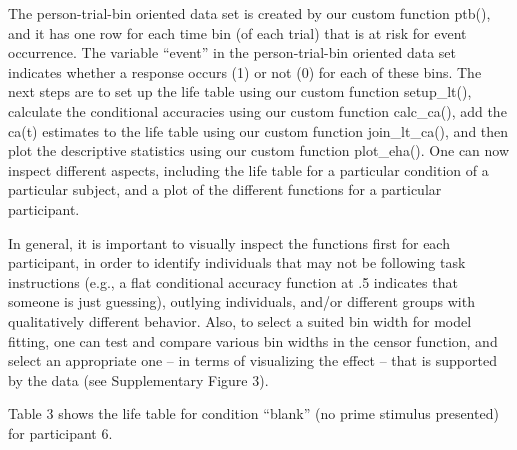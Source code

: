 \documentclass[
  english,
  man, donotrepeattitle,floatsintext]{apa6}
\begin{document}
The person-trial-bin oriented data set is created by our custom function ptb(), and it has one row for each time bin (of each trial) that is at risk for event occurrence. The variable ``event'' in the person-trial-bin oriented data set indicates whether a response occurs (1) or not (0) for each of these bins. The next steps are to set up the life table using our custom function setup\_lt(), calculate the conditional accuracies using our custom function calc\_ca(), add the ca(t) estimates to the life table using our custom function join\_lt\_ca(), and then plot the descriptive statistics using our custom function plot\_eha().
One can now inspect different aspects, including the life table for a particular condition of a particular subject, and a plot of the different functions for a particular participant.

In general, it is important to visually inspect the functions first for each participant, in order to identify individuals that may not be following task instructions (e.g., a flat conditional accuracy function at .5 indicates that someone is just guessing), outlying individuals, and/or different groups with qualitatively different behavior. Also, to select a suited bin width for model fitting, one can test and compare various bin widths in the censor function, and select an appropriate one -- in terms of visualizing the effect -- that is supported by the data (see Supplementary Figure 3).

Table 3 shows the life table for condition ``blank'' (no prime stimulus presented) for participant 6.





\renewcommand{\arraystretch}{1.5}
\end{document}
